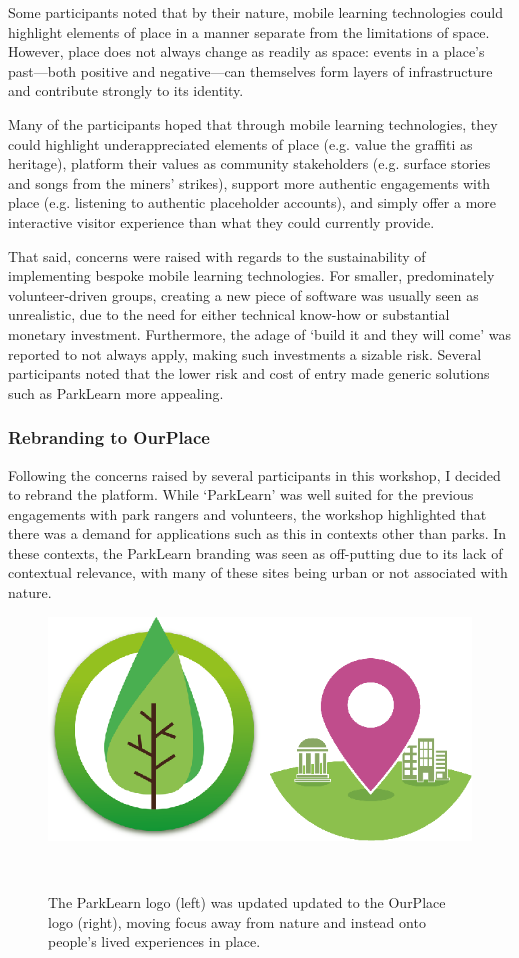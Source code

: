 Some participants noted that by their nature, mobile learning technologies could highlight elements of place in a manner separate from the limitations of space. However, place does not always change as readily as space: events in a place's past---both positive and negative---can themselves form layers of infrastructure and contribute strongly to its identity. 

Many of the participants hoped that through mobile learning technologies, they could highlight underappreciated elements of place (e.g. value the graffiti as heritage), platform their values as community stakeholders (e.g. surface stories and songs from the miners' strikes), support more authentic engagements with place (e.g. listening to authentic placeholder accounts), and simply offer a more interactive visitor experience than what they could currently provide.

That said, concerns were raised with regards to the sustainability of implementing bespoke mobile learning technologies. For smaller, predominately volunteer-driven groups, creating a new piece of software was usually seen as unrealistic, due to the need for either technical know-how or substantial monetary investment. Furthermore, the adage of `build it and they will come' was reported to not always apply, making such investments a sizable risk. Several participants noted that the lower risk and cost of entry made generic solutions such as ParkLearn more appealing.

\subsubsection{Rebranding to OurPlace}
Following the concerns raised by several participants in this workshop, I decided to rebrand the platform. While `ParkLearn' was well suited for the previous engagements with park rangers and volunteers, the workshop highlighted that there was a demand for applications such as this in contexts other than parks. In these contexts, the ParkLearn branding was seen as off-putting due to its lack of contextual relevance, with many of these sites being urban or not associated with nature. 

\begin{figure}
  \centering
  \includegraphics[width=0.8\columnwidth]{images/chapter06/logos.png}
  \caption[The ParkLearn and OurPlace Logos]{The ParkLearn logo (left) was updated updated to the OurPlace logo (right), moving focus away from nature and instead onto people's lived experiences in place.}~\label{fig:AppLogos}
\end{figure}

